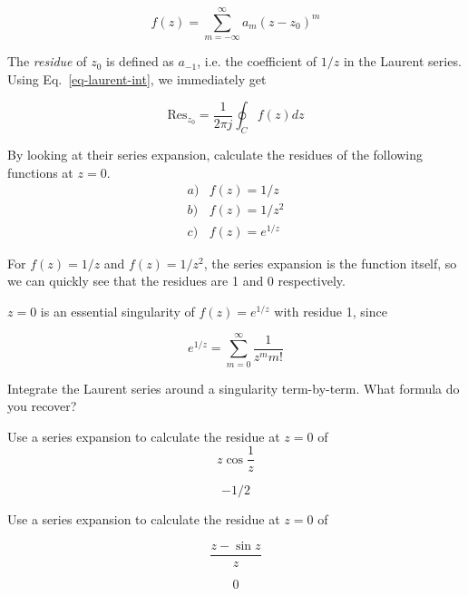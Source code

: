 \begin{equation}
f(z)= \sum_{m=-\infty}^{\infty} a_m (z-z_0)^m
\end{equation} 

The \emph{residue} of $z_0$ is defined as $a_{-1}$, i.e. the coefficient of $1/z$ in the Laurent series. Using Eq.~\ref{eq-laurent-int}, we immediately get

\begin{equation}
\mathrm{Res}_{z_0}=\frac{1}{2 \pi j }  \oint_{{C}} f(z) dz \label{eq-res-int}
\end{equation}

\begin{cue}
  By looking at their series expansion, calculate the residues of the following functions at $z=0$.
  $$\begin{array}{lcll}a) & f(z)=1/z \\b) & f(z)=1/z^2 \\c) & f(z)=e^{1/z}\end{array}$$
\end{cue}

For $f(z)=1/z$ and $f(z)=1/z^2$, the series expansion is the function itself, so we can quickly see that the residues are 1 and 0 respectively.

$z=0$ is an essential singularity of $f(z)=e^{1/z}$ with residue 1, since

$$e^{1/z} = \sum_{m=0}^{\infty} \frac{1}{z^m m!} $$

\begin{exer}
  Integrate the Laurent series around a singularity term-by-term. What formula do you recover?
\end{exer}

\begin{exer}
  Use a series expansion to calculate the residue at $z=0$ of
  $$z \cos \frac{1}{z}$$
  \begin{sol}
    $$-1/2$$
  \end{sol}
\end{exer}

\begin{exer}
  Use a series expansion to calculate the residue at $z=0$ of

  $$\frac{z - \sin z}{z}$$
  \begin{sol}
    $$0$$
  \end{sol}
\end{exer}


